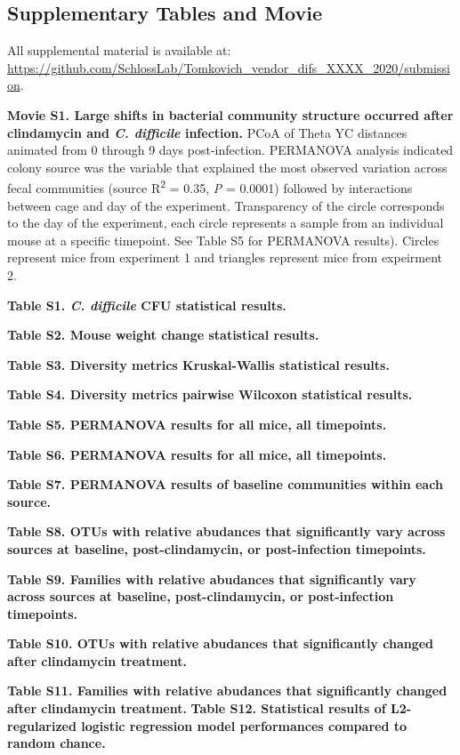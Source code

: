 \documentclass[11pt,]{article}
\begin{document}
\newpage

\subsection{Supplementary Tables and
Movie}\label{supplementary-tables-and-movie}

All supplemental material is available at:
\url{https://github.com/SchlossLab/Tomkovich_vendor_difs_XXXX_2020/submission}.

\textbf{Movie S1. Large shifts in bacterial community structure occurred
after clindamycin and \emph{C. difficile} infection.} PCoA of Theta YC
distances animated from 0 through 9 days post-infection. PERMANOVA
analysis indicated colony source was the variable that explained the
most observed variation across fecal communities (source
R\textsuperscript{2} = 0.35, \emph{P} = 0.0001) followed by interactions
between cage and day of the experiment. Transparency of the circle
corresponds to the day of the experiment, each circle represents a
sample from an individual mouse at a specific timepoint. See Table S5
for PERMANOVA results). Circles represent mice from experiment 1 and
triangles represent mice from expeirment 2.

\textbf{Table S1. \emph{C. difficile} CFU statistical results.}

\textbf{Table S2. Mouse weight change statistical results.}

\textbf{Table S3. Diversity metrics Kruskal-Wallis statistical results.}

\textbf{Table S4. Diversity metrics pairwise Wilcoxon statistical
results.}

\textbf{Table S5. PERMANOVA results for all mice, all timepoints.}

\textbf{Table S6. PERMANOVA results for all mice, all timepoints.}

\textbf{Table S7. PERMANOVA results of baseline communities within each
source.}

\textbf{Table S8. OTUs with relative abudances that significantly vary
across sources at baseline, post-clindamycin, or post-infection
timepoints.}

\textbf{Table S9. Families with relative abudances that significantly
vary across sources at baseline, post-clindamycin, or post-infection
timepoints.}

\textbf{Table S10. OTUs with relative abudances that significantly
changed after clindamycin treatment.}

\textbf{Table S11. Families with relative abudances that significantly
changed after clindamycin treatment.} \textbf{Table S12. Statistical
results of L2-regularized logistic regression model performances
compared to random chance.}
\end{document}
